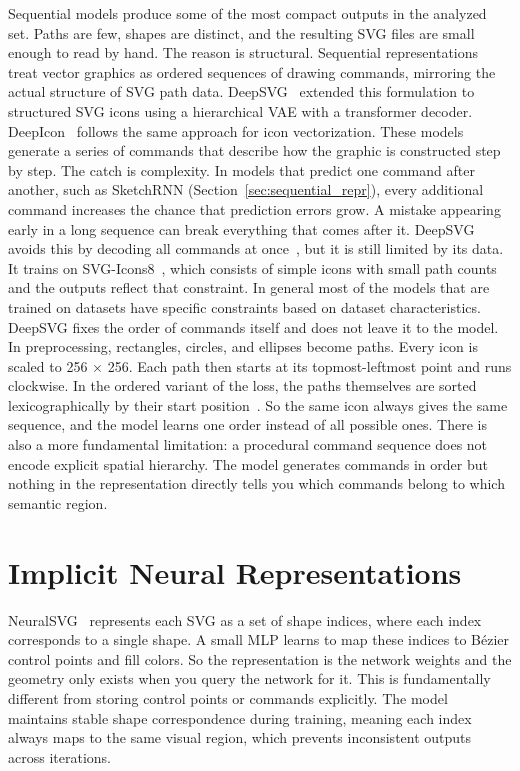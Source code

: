 Sequential models produce some of the most compact outputs in the analyzed set. 
Paths are few, shapes are distinct, and the resulting SVG files are small enough to read by hand.
The reason is structural. Sequential representations treat vector graphics as ordered sequences of drawing commands,
mirroring the actual structure of SVG path data. DeepSVG~\cite{carlierDeepSVGHierarchicalGenerative2020} 
extended this formulation to structured SVG icons using a hierarchical VAE with a transformer decoder. 
DeepIcon~\cite{bingDeepIconHierarchicalNetwork2024} follows the same approach for icon vectorization. 
These models generate a series of commands that describe how the graphic is constructed step by step.
The catch is complexity. In models that predict one command after another, such as SketchRNN (Section~\ref{sec:sequential_repr}), 
every additional command increases the chance that prediction errors grow. 
A mistake appearing early in a long sequence can break everything that comes after it. 
DeepSVG avoids this by decoding all commands at once~\cite{carlierDeepSVGHierarchicalGenerative2020}, but it is still limited by its data. 
It trains on SVG-Icons8~\cite{carlierDeepSVGHierarchicalGenerative2020}, 
which consists of simple icons with small path counts and the outputs reflect that constraint.
In general most of the models that are trained on datasets have specific constraints based on dataset characteristics.
DeepSVG fixes the order of commands itself and does not leave it to the model. In preprocessing, rectangles, circles, and 
ellipses become paths. Every icon is scaled to 256 $\times$ 256. Each path then starts at its topmost-leftmost point 
and runs clockwise. In the ordered variant of the loss, the paths 
themselves are sorted lexicographically by their start position~\cite{carlierDeepSVGHierarchicalGenerative2020}. 
So the same icon always gives the same sequence, and the model learns one order instead of all possible ones.
There is also a more fundamental limitation: a procedural command sequence does not encode explicit spatial hierarchy. 
The model generates commands in order but nothing in the representation directly tells you which commands belong to which semantic region.


\section{Implicit Neural Representations}
\label{sec:implicit}

NeuralSVG~\cite{polaczekNeuralSVGImplicitRepresentation2025} represents each SVG as a set of shape indices, 
where each index corresponds to a single shape. A small MLP learns to map these indices to B\'{e}zier control points and fill colors. 
So the representation is the network weights and the geometry only exists when you query the network for it.
This is fundamentally different from storing control points or commands explicitly. 
The model maintains stable shape correspondence during training, meaning each index always maps to the same visual region, 
which prevents inconsistent outputs across iterations. 

